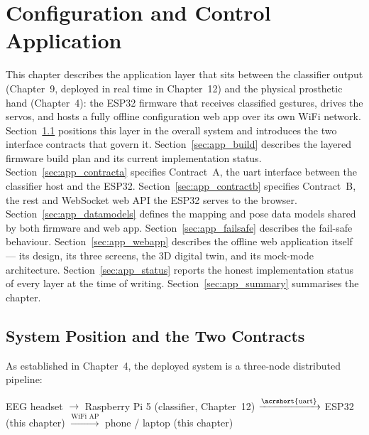 \chapter{Configuration and Control Application}
\label{ch:application}

This chapter describes the application layer that sits between the
classifier output (Chapter~9, deployed in real time in Chapter~12)
and the physical prosthetic hand (Chapter~4): the ESP32 firmware
that receives classified gestures, drives the servos, and hosts a
fully offline configuration web app over its own WiFi network.
Section~\ref{sec:app_overview} positions this layer in the overall
system and introduces the two interface contracts that govern it.
Section~\ref{sec:app_build} describes the layered firmware build
plan and its current implementation status.
Section~\ref{sec:app_contracta} specifies Contract~A, the
\acrshort{uart} interface between the classifier host and the
ESP32. Section~\ref{sec:app_contractb} specifies Contract~B, the
\acrshort{rest} and WebSocket web API the ESP32 serves to the
browser. Section~\ref{sec:app_datamodels} defines the mapping and
pose data models shared by both firmware and web app.
Section~\ref{sec:app_failsafe} describes the fail-safe behaviour.
Section~\ref{sec:app_webapp} describes the offline web application
itself --- its design, its three screens, the 3D digital twin, and
its mock-mode architecture. Section~\ref{sec:app_status} reports
the honest implementation status of every layer at the time of
writing. Section~\ref{sec:app_summary} summarises the chapter.

\section{System Position and the Two Contracts}
\label{sec:app_overview}

As established in Chapter~4, the deployed system is a three-node
distributed pipeline:

\begin{center}
EEG headset $\rightarrow$ Raspberry Pi 5 (classifier, Chapter~12)
$\xrightarrow{\text{\acrshort{uart}}}$ ESP32 (this chapter)
$\xrightarrow{\text{WiFi AP}}$ phone / laptop (this chapter)
\end{center}

